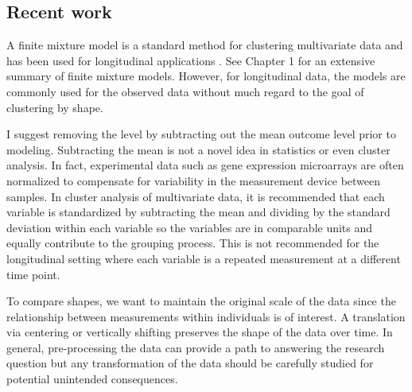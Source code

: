 \subsection{Recent work}
A finite mixture model is a standard method for clustering multivariate data \cite{everitt2009} and has been used for longitudinal applications \cite{muthen2010, jones2001}. See Chapter 1 for an extensive summary of finite mixture models. However, for longitudinal data, the models are commonly used for the observed data without much regard to the goal of clustering by shape. 

I suggest removing the level by subtracting out the mean outcome level prior to modeling. Subtracting the mean is not a novel idea in statistics or even cluster analysis. In fact, experimental data such as gene expression microarrays are often normalized to compensate for variability in the measurement device between samples. In cluster analysis of multivariate data, it is recommended that each variable is standardized by subtracting the mean and dividing by the standard deviation within each variable so the variables are in comparable units and equally contribute to the grouping process. This is not recommended for the longitudinal setting where each variable is a repeated measurement at a different time point. 

To compare shapes, we want to maintain the original scale of the data since the relationship between measurements within individuals is of interest. A translation via centering \cite{chiou2008} or vertically shifting preserves the shape of the data over time. In general, pre-processing the data can provide a path to answering the research question but any transformation of the data should be carefully studied for potential unintended consequences.

